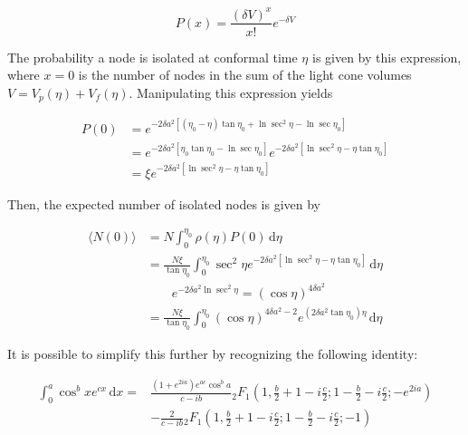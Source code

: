 \documentclass[preprint,notitlepage,amsmath,amssymb,floatfix]{revtex4-1}
\begin{document}
\begin{equation}
P(x) = \frac{\left(\delta V\right)^x}{x!}e^{-\delta V}
\end{equation}

\noindent The probability a node is isolated at conformal time $\eta$ is given by this expression, where $x=0$ is the number of nodes in the sum of the light cone volumes $V=V_p\left(\eta\right)+V_f\left(\eta\right)$.  
Manipulating this expression yields

\begin{equation}
\begin{split}
P\left(0\right) &= e^{-2\delta a^2\left[\left(\eta_0-\eta\right)\tan\eta_0 + \ln\sec^2\eta - \ln\sec\eta_0\right]} \\
  &= e^{-2\delta a^2\left[\eta_0\tan\eta_0 - \ln\sec\eta_0\right]}e^{-2\delta a^2\left[\ln\sec^2\eta - \eta\tan\eta_0\right]} \\
  &=\xi e^{-2\delta a^2\left[\ln\sec^2\eta-\eta\tan\eta_0\right]}
\end{split}
\end{equation}

\noindent Then, the expected number of isolated nodes is given by

\begin{equation}
\begin{split}
\langle N\left(0\right)\rangle &= N\int_0^{\eta_0}\!\rho\left(\eta\right)P\left(0\right)\,\mathrm d\eta \\
  &= \frac{N\xi}{\tan\eta_0}\int_0^{\eta_0}\!\sec^2\eta e^{-2\delta a^2\left[\ln\sec^2\eta - \eta\tan\eta_0\right]}\,\mathrm d\eta \\
  &\qquad e^{-2\delta a^2\ln\sec^2\eta} = \left(\cos\eta\right)^{4\delta a^2} \\
  &= \frac{N\xi}{\tan\eta_0}\int_0^{\eta_0}\left(\cos\eta\right)^{4\delta a^2 - 2} e^{\left(2\delta a^2 \tan\eta_0\right)\eta}\,\mathrm d\eta
\end{split}
\end{equation}

\noindent It is possible to simplify this further by recognizing the following identity:

\begin{equation}
\begin{split}
\int_0^a\!\cos^bxe^{cx}\,\mathrm dx = &\frac{\left(1+e^{2ia}\right)e^{ac}\cos^ba}{c-ib} {}_2F_1\left(1,\frac{b}{2}+1-i\frac{c}{2};1-\frac{b}{2}-i\frac{c}{2};-e^{2ia}\right) \\
& - \frac{2}{c-ib} {}_2F_1\left(1,\frac{b}{2}+1-i\frac{c}{2};1-\frac{b}{2}-i\frac{c}{2};-1\right)
\end{split}
\end{equation}
\end{document}
